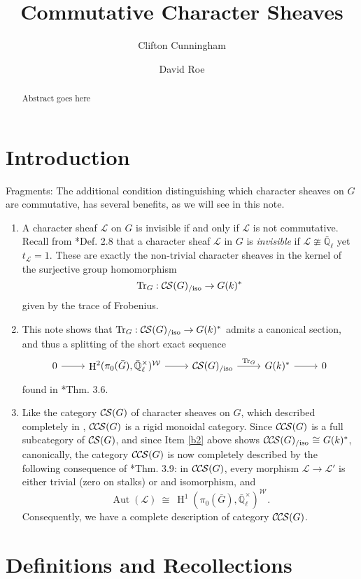 \documentclass[10pt]{amsart}
\title{Commutative Character Sheaves}
\author{Clifton Cunningham}
\author{David Roe}
\makeatletter
\theoremstyle{plain}
\theoremstyle{definition}
\newcommand{\EE}{\mathbb{\bar Q}_\ell}
\newcommand{\Fq}{k}
\newcommand{\EEx}{\EE^\times}
\newcommand{\Weil}[1]{\mathcal{W}_{#1}}
\DeclareMathOperator{\Aut}{Aut}
\DeclareMathOperator{\Hh}{H}
\newcommand{\iso}{{\ \cong\ }}
\newcommand{\trFrob}[1]{t_{#1}}
\newcommand{\TrFrob}[1]{\operatorname{Tr}_{#1}}
\newcommand{\cs}[1]{{\mathcal{#1}}}
\newcommand{\CS}{{\mathcal{C\hskip-0.8pt S}}}
\newcommand{\CCS}{{\mathcal{C\hskip-.8pt C\hskip-0.8pt S}}}
\newcommand{\CSiso}[1]{\CS(#1)_{/\text{iso}}}
\newcommand{\CCSiso}[1]{\CCS(#1)_{/\text{iso}}}
\newcommand{\labitem}[2]{
\def\@itemlabel{\textbf{#1}}
\item
\def\@currentlabel{#1}\label{#2}}
\newcommand{\bG}{\bar{G}}
\makeatother
\begin{document}
\begin{abstract}
Abstract goes here
\end{abstract}

\maketitle

\section*{Introduction}

Fragments: 
The additional condition distinguishing which character sheaves on $G$ are commutative, has several benefits, as we will see in this note.
\begin{enumerate}
\labitem{(1)}{b1}
A character sheaf $\cs{L}$ on $G$ is invisible if and only if $\cs{L}$ is not commutative.
Recall from \cite{cunningham-roe:13a}*{Def. 2.8} that a character sheaf $\cs{L}$ in $G$ is {\it invisible} if $\cs{L}  \ncong \EE$ yet $\trFrob{\cs{L}} =1$.
These are exactly the non-trivial character sheaves in the kernel of the surjective group homomorphism 
\[
\TrFrob{G} : \CSiso{G} \to G(\Fq)^*
\]
 given by the trace of Frobenius.
\labitem{(2)}{b2}
This note shows that $\TrFrob{G} : \CSiso{G} \to G(\Fq)^*$ admits a canonical section, and thus a splitting of the short exact sequence 
\[
\begin{tikzcd}
0 \arrow{r} & \Hh^2(\pi_0(\bG),\EEx)^{\Weil{}} \arrow{r} & \CSiso{G} \arrow{r}{\TrFrob{G}} & G(\Fq)^* \arrow{r} & 0
\end{tikzcd}
\]
found in \cite{cunningham-roe:13a}*{Thm. 3.6}.
\labitem{(3)}{b3}
Like the category $\CS(G)$ of character sheaves on $G$, which described completely in \cite{cunningham-roe:13a}, $\CCS(G)$ is a rigid monoidal category.
Since $\CCS(G)$ is a full subcategory of $\CS(G)$, and since Item \ref{b2} above shows $\CCSiso{G} \iso G(\Fq)^*$, canonically, the category $\CCS(G)$ is now completely described by the following consequence of \cite{cunningham-roe:13a}*{Thm. 3.9}: in $\CCS(G)$, every morphism $\cs{L} \to \cs{L}'$ is either trivial (zero on stalks) or and isomorphism, and
\[
\Aut(\cs{L}) \iso  \Hh^1(\pi_0(\bG), \EEx)^{\Weil{}}.
\]
Consequently, we have a complete description of category $\CCS(G)$.
\end{enumerate}




\section{Definitions and Recollections}
\end{document}
